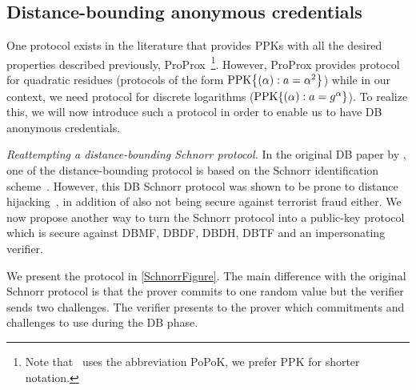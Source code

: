 \subsection{Distance-bounding anonymous credentials}%
\label{DB-anon-cred}


One protocol exists in the literature that provides \acp{PPK} with all the 
desired properties described previously, ProProx~\cite{ProProx}\footnote{Note 
  that~\cite{ProProx} uses the abbreviation PoPoK, we prefer \acs{PPK} for 
  shorter notation.}.
However, ProProx provides  protocol for quadratic residues (\ie protocols of the form \(\PPK[\alpha][a = \alpha^2]\)) while in our context, we need  protocol for discrete logarithms (\ie \(\PPK[\alpha][a = g^\alpha]\)).
To realize this, we will now introduce such a protocol in order to enable us to have \ac{DB} anonymous credentials.


\emph{Reattempting a distance-bounding Schnorr protocol.}
In the original \ac{DB} paper by \citet{DistanceBounding}, one of the distance-bounding protocol is based on the Schnorr identification scheme~\cite{Schnorr}.
However, this \ac{DB} Schnorr protocol was shown to be prone to distance hijacking~\cite{DistanceHijacking}, in addition of also not being secure against terrorist fraud either.
We now propose another way to turn the Schnorr protocol into a public-key  protocol which is secure against \ac{DBMF}, \ac{DBDF}, \ac{DBDH}, \ac{DBTF} and an impersonating verifier.

We present the protocol in \cref{SchnorrFigure}.
The main difference with the original Schnorr protocol is that the prover commits to one random value but the verifier sends two challenges.
The verifier presents to the prover which commitments and challenges to use during the \ac{DB} phase.

